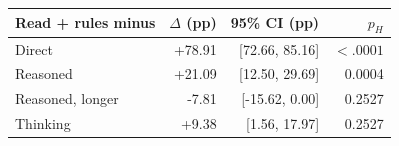 \begin{tabular}{lrrr}
\toprule
Read + rules minus & $\Delta$ (pp) & 95\% CI (pp) & $p_H$ \\
\midrule
Direct & +78.91 & [72.66, 85.16] & $<.0001$ \\
Reasoned & +21.09 & [12.50, 29.69] & 0.0004 \\
Reasoned, longer & -7.81 & [-15.62, 0.00] & 0.2527 \\
Thinking & +9.38 & [1.56, 17.97] & 0.2527 \\
\bottomrule
\end{tabular}
